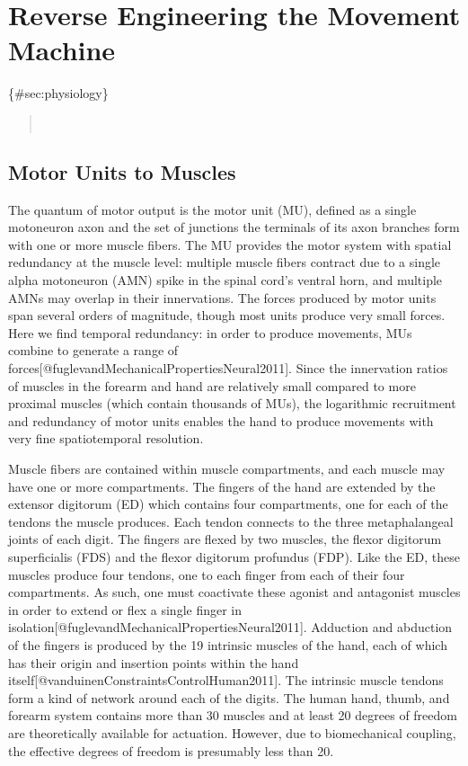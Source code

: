 \section{Reverse Engineering the Movement
Machine}\label{reverse-engineering-the-movement-machine}

\{\#sec:physiology\}

\begin{quote}
  \\
\end{quote}

\subsection{Motor Units to Muscles}\label{motor-units-to-muscles}

The quantum of motor output is the motor unit (MU), defined as a single
motoneuron axon and the set of junctions the terminals of its axon
branches form with one or more muscle fibers. The MU provides the motor
system with spatial redundancy at the muscle level: multiple muscle
fibers contract due to a single alpha motoneuron (AMN) spike in the
spinal cord's ventral horn, and multiple AMNs may overlap in their
innervations. The forces produced by motor units span several orders of
magnitude, though most units produce very small forces. Here we find
temporal redundancy: in order to produce movements, MUs combine to
generate a range of
forces{[}@fuglevandMechanicalPropertiesNeural2011{]}. Since the
innervation ratios of muscles in the forearm and hand are relatively
small compared to more proximal muscles (which contain thousands of
MUs), the logarithmic recruitment and redundancy of motor units enables
the hand to produce movements with very fine spatiotemporal resolution.

Muscle fibers are contained within muscle compartments, and each muscle
may have one or more compartments. The fingers of the hand are extended
by the extensor digitorum (ED) which contains four compartments, one for
each of the tendons the muscle produces. Each tendon connects to the
three metaphalangeal joints of each digit. The fingers are flexed by two
muscles, the flexor digitorum superficialis (FDS) and the flexor
digitorum profundus (FDP). Like the ED, these muscles produce four
tendons, one to each finger from each of their four compartments. As
such, one must coactivate these agonist and antagonist muscles in order
to extend or flex a single finger in
isolation{[}@fuglevandMechanicalPropertiesNeural2011{]}. Adduction and
abduction of the fingers is produced by the 19 intrinsic muscles of the
hand, each of which has their origin and insertion points within the
hand itself{[}@vanduinenConstraintsControlHuman2011{]}. The intrinsic
muscle tendons form a kind of network around each of the digits. The
human hand, thumb, and forearm system contains more than 30 muscles and
at least 20 degrees of freedom are theoretically available for
actuation. However, due to biomechanical coupling, the effective degrees
of freedom is presumably less than 20.

